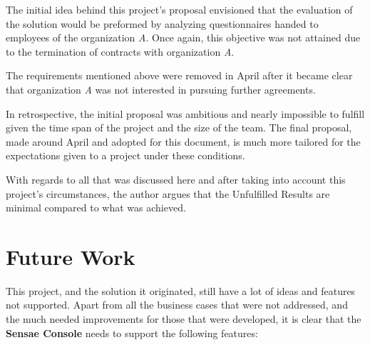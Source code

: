 The initial idea behind this project's proposal envisioned that the evaluation of the solution would be preformed by analyzing questionnaires handed to employees of the organization \textit{A}. Once again, this objective was not attained due to the termination of contracts with organization \textit{A}.

The requirements mentioned above were removed in April after it became clear that organization \textit{A} was not interested in pursuing further agreements.

In retrospective, the initial proposal was ambitious and nearly impossible to fulfill given the time span of the project and the size of the team. The final proposal, made around April and adopted for this document, is much more tailored for the expectations given to a project under these conditions.

With regards to all that was discussed here and after taking into account this project's circumstances, the author argues that the Unfulfilled Results are minimal compared to what was achieved. 

\section{Future Work}
\label{sec:conclusion:future}

This project, and the solution it originated, still have a lot of ideas and features not supported. Apart from all the business cases that were not addressed, and the much needed improvements for those that were developed, it is clear that the \textbf{Sensae Console} needs to support the following features:

